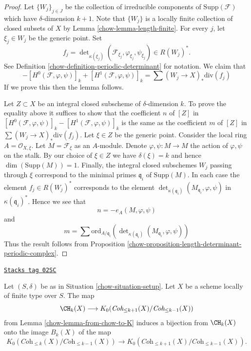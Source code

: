 \begin{proof}

Let $\{W_j\}_{j \in J}$ be the collection of irreducible
components of $\text{Supp}(\mathcal{F})$
which have $\delta$-dimension $k + 1$. Note that $\{W_j\}$
is a locally finite collection of closed subsets of
$X$ by Lemma \ref{chow-lemma-length-finite}.
For every $j$, let $\xi_j \in W_j$ be the generic point.
Set
$$
f_j = \det\nolimits_{\kappa(\xi_j)}
(\mathcal{F}_{\xi_j}, \varphi_{\xi_j}, \psi_{\xi_j})
\in
R(W_j)^*.
$$
See Definition \ref{chow-definition-periodic-determinant} for notation.
We claim that
$$
- [H^0(\mathcal{F}, \varphi, \psi)]_k + [H^1(\mathcal{F}, \varphi, \psi)]_k
=
\sum (W_j \to X)_*\text{div}(f_j)
$$
If we prove this then the lemma follows.

\medskip\noindent
Let $Z \subset X$ be an integral closed subscheme of $\delta$-dimension $k$.
To prove the equality above it suffices to show that the coefficient $n$
of $[Z]$ in
$
[H^0(\mathcal{F}, \varphi, \psi)]_k - [H^1(\mathcal{F}, \varphi, \psi)]_k
$
is the same as the coefficient $m$ of $[Z]$ in
$
\sum (W_j \to X)_*\text{div}(f_j)
$.
Let $\xi \in Z$ be the generic point.
Consider the local ring $A = \mathcal{O}_{X, \xi}$.
Let $M = \mathcal{F}_\xi$ as an $A$-module.
Denote $\varphi, \psi : M \to M$ the action of $\varphi, \psi$ on
the stalk.
By our choice of $\xi \in Z$ we have $\delta(\xi) = k$
and hence $\dim(\text{Supp}(M)) = 1$.
Finally, the integral closed subschemes
$W_j$ passing through $\xi$ correspond to the minimal primes
$\mathfrak q_i$ of $\text{Supp}(M)$.
In each case the element $f_j \in R(W_j)^*$ corresponds to
the element $\det_{\kappa(\mathfrak q_i)}(M_{\mathfrak q_i}, \varphi, \psi)$
in $\kappa(\mathfrak q_i)^*$. Hence we see that
$$
n = - e_A(M, \varphi, \psi)
$$
and
$$
m =
\sum
\text{ord}_{A/\mathfrak q_i}
(\det\nolimits_{\kappa(\mathfrak q_i)}(M_{\mathfrak q_i}, \varphi, \psi))
$$
Thus the result follows from
Proposition \ref{chow-proposition-length-determinant-periodic-complex}.
\end{proof}

\begin{lemma}
\label{chow-lemma-cycles-rational-equivalence-K-group}
\href{https://stacks.math.columbia.edu/tag/02SC}{\texttt{Stacks tag 02SC}}

Let $(S, \delta)$ be as in Situation \ref{chow-situation-setup}.
Let $X$ be a scheme locally of finite type over $S$.
The map
$$
\CH_k(X) \longrightarrow
K_0(\textit{Coh}_{\leq k + 1}(X)/\textit{Coh}_{\leq k - 1}(X))
$$
from Lemma \ref{chow-lemma-from-chow-to-K} induces a bijection from
$\CH_k(X)$ onto the image $B_k(X)$ of the map
$$
K_0(\textit{Coh}_{\leq k}(X)/\textit{Coh}_{\leq k - 1}(X))
\longrightarrow
K_0(\textit{Coh}_{\leq k + 1}(X)/\textit{Coh}_{\leq k - 1}(X)).
$$
\end{lemma}

